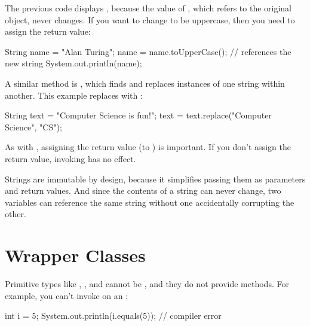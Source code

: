 The previous code displays , because the value of , which refers to the original  object, never changes.
If you want to change  to be uppercase, then you need to assign the return value:

\begin{code}
String name = "Alan Turing";
name = name.toUpperCase();    // references the new string
System.out.println(name);
\end{code}


A similar method is , which finds and replaces instances of one string within another.
This example replaces  with :

\begin{code}
String text = "Computer Science is fun!";
text = text.replace("Computer Science", "CS");
\end{code}


As with , assigning the return value (to ) is important.
If you don't assign the return value, invoking  has no effect.

Strings are immutable by design, because it simplifies passing them as parameters and return values.
And since the contents of a string can never change, two variables can reference the same string without one accidentally corrupting the other.


\section{Wrapper Classes}

Primitive types like , , and  cannot be , and they do not provide methods.
For example, you can't invoke  on an :

\begin{code}
int i = 5;
System.out.println(i.equals(5));  // compiler error
\end{code}


